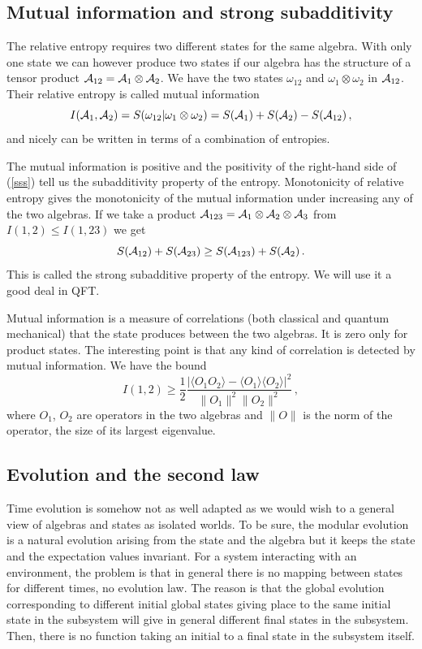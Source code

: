\documentclass[11pt]{article}
\numberwithin{equation}{section}
\newcommand{\be}{\begin{equation}}
\newcommand{\ee}{\end{equation}}
\begin{document}
\subsection{Mutual information and strong subadditivity}
\label{mumu}


The relative entropy requires two different states for the same algebra. With only one state we can however produce two states if our algebra has the structure of a tensor product ${\cal A}_{12}={\cal A}_1\otimes {\cal A}_2$. We have the two states $\omega_{12}$ and $\omega_1\otimes \omega_2$ in   ${\cal A}_{12}$. Their relative entropy is called mutual information 
\be
I({\cal A}_1, {\cal A}_2)= S(\omega_{12}|\omega_1\otimes \omega_2)=S({\cal A}_1)+S({\cal A}_2)-S({\cal A}_{12})\,,
\label{sss} \ee
and nicely can be written in terms of a combination of entropies. 

The mutual information is positive and the positivity of the right-hand side of (\ref{sss}) tell us the subadditivity property of the entropy. Monotonicity of relative entropy gives the monotonicity of the mutual information under increasing any of the two algebras. If we take a product  ${\cal A}_{123}={\cal A}_1\otimes {\cal A}_2\otimes {\cal A}_3$ from $I(1,2)\le I(1,23)$ we get 
\be
S({\cal A}_{12})+S({\cal A}_{23})\ge S({\cal A}_{123})+S({\cal A}_{2})\,.
\ee
This is called the strong subadditive property of the entropy. We will use it a good deal in QFT. 

Mutual information is a measure of correlations (both classical and quantum mechanical) that the state produces between the two algebras. It is zero only for product states. The interesting point is that any kind of correlation is detected by mutual information. We have the bound
\be  
I(1,2)\ge \frac{1}{2}\frac{|\langle O_1 O_2\rangle -\langle O_1 \rangle \langle O_2 \rangle|^2}{\|O_1\|^2 \|O_2\|^2 }\,,
\ee
where $O_1$, $O_2$ are operators in the two algebras and $\|O\|$ is the norm of the operator, the size of its largest eigenvalue. 

\subsection{Evolution and the second law}

Time evolution is somehow not as well adapted as we would wish to a general view of algebras and states as isolated worlds. 
To be sure, the modular evolution is a natural evolution arising from the state and the algebra but it keeps the state and the expectation values invariant. For a system interacting with an environment, the problem is that in general there is no mapping between states for different times, no evolution law. The reason is that the global evolution corresponding to different initial global states giving place to the same initial state in the subsystem will give in general different final states in the subsystem. Then, there is no function taking an initial to a final state in the subsystem itself.   
\end{document}
